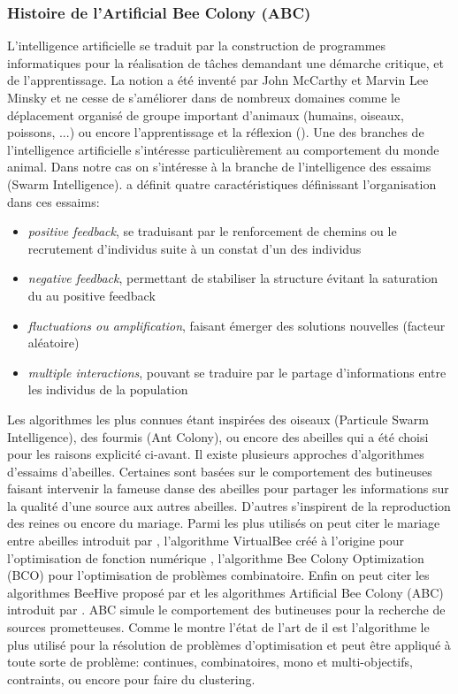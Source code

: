 \subsubsection{Histoire de l’Artificial Bee Colony (ABC)} %
\label{ssub:histoire_de_l_artificial_bee_colony}
L’intelligence artificielle se traduit par la construction de programmes informatiques
pour la réalisation de tâches demandant une démarche critique, et de l’apprentissage. La
notion a été inventé par John McCarthy et Marvin Lee Minsky et ne cesse de s’améliorer
dans de nombreux domaines comme le déplacement organisé de groupe important d’animaux (humains, oiseaux, poissons, ...)
ou encore l’apprentissage et la réflexion (\cite{Hsu199970,Silver2016484}).
Une des branches de l’intelligence artificielle s’intéresse particulièrement au comportement
du monde animal. Dans notre cas on s’intéresse à la branche de l’intelligence des
essaims (Swarm Intelligence). \cite{Bonabeau1999} a définit quatre caractéristiques
définissant l’organisation dans ces essaims:
\begin{itemize}
    \item \emph{positive feedback}, se traduisant par le renforcement de chemins ou le recrutement d’individus suite à un constat
          d’un des individus
    \item \emph{negative feedback}, permettant de stabiliser la structure évitant la saturation du au positive feedback
    \item \emph{fluctuations ou amplification}, faisant émerger des solutions nouvelles (facteur aléatoire)
    \item \emph{multiple interactions}, pouvant se traduire par le partage d’informations entre les individus de la population
\end{itemize}
Les algorithmes les plus connues étant inspirées des oiseaux (Particule Swarm Intelligence),
des fourmis (Ant Colony), ou encore des abeilles qui a été choisi pour les raisons explicité ci-avant.
Il existe plusieurs approches d’algorithmes d’essaims d’abeilles. Certaines sont basées
sur le comportement des butineuses faisant intervenir la fameuse danse des abeilles pour partager
les informations sur la qualité d’une source aux autres abeilles. D’autres s’inspirent de la
reproduction des reines ou encore du mariage.
Parmi les plus utilisés on peut citer le mariage entre abeilles introduit par \cite{Abbass20011}, l’algorithme VirtualBee
créé à l’origine pour l’optimisation de fonction numérique \cite{Yang2005317}, l’algorithme Bee Colony Optimization (BCO)
\cite{Lucic2001441} pour l’optimisation de problèmes combinatoire. Enfin on peut citer les
algorithmes BeeHive proposé par \cite{Wedde200483} et les algorithmes Artificial Bee Colony (ABC) introduit par
\cite{Karaboga2005}. ABC simule le comportement des butineuses pour la recherche de sources prometteuses.
Comme le montre l’état de l’art de \cite{Karaboga201221} il est l’algorithme le plus
utilisé pour la résolution de problèmes d’optimisation et peut être appliqué à toute sorte de problème: continues,
combinatoires, mono et multi-objectifs, contraints, ou encore pour faire du clustering.

